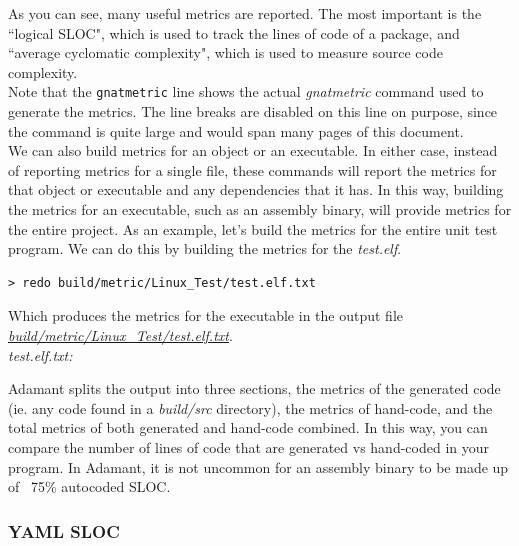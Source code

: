 As you can see, many useful metrics are reported. The most important is the ``logical SLOC", which is used to track the lines of code of a package, and ``average cyclomatic complexity", which is used to measure source code complexity. \\

Note that the \texttt{gnatmetric} line shows the actual \textit{gnatmetric} command used to generate the metrics. The line breaks are disabled on this line on purpose, since the command is quite large and would span many pages of this document. \\

We can also build metrics for an object or an executable. In either case, instead of reporting metrics for a single file, these commands will report the metrics for that object or executable and any dependencies that it has. In this way, building the metrics for an executable, such as an assembly binary, will provide metrics for the entire project. As an example, let's build the metrics for the entire unit test program. We can do this by building the metrics for the \textit{test.elf}.

\vspace{5mm} %
\begin{verbatim}
> redo build/metric/Linux_Test/test.elf.txt
\end{verbatim}
\vspace{5mm} %

Which produces the metrics for the executable in the output file \textit{\url{build/metric/Linux\_Test/test.elf.txt}}. \\

\textit{test.elf.txt:}

Adamant splits the output into three sections, the metrics of the generated code (ie. any code found in a \textit{build/src} directory), the metrics of hand-code, and the total metrics of both generated and hand-code combined. In this way, you can compare the number of lines of code that are generated vs hand-coded in your program. In Adamant, it is not uncommon for an assembly binary to be made up of ~75\% autocoded SLOC.

\subsubsection{YAML SLOC}

